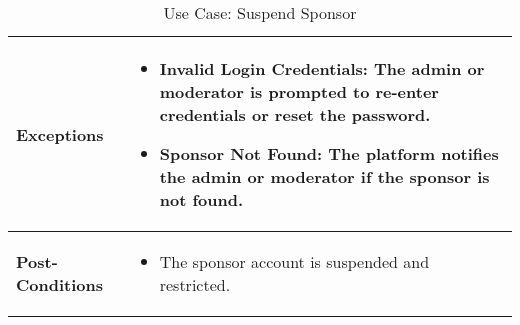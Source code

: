 \begin{table}[!ht]
\begin{tabularx}{\textwidth}{|l|X|}
        \textbf{Exceptions} & 
        \begin{itemize}[label=--,itemsep=0pt]
            \item Invalid Login Credentials: The admin or moderator is prompted to re-enter credentials or reset the password.
            \item Sponsor Not Found: The platform notifies the admin or moderator if the sponsor is not found.
        \end{itemize} \\
        \hline
        \textbf{Post-Conditions} & 
        \begin{itemize}[label=--,itemsep=0pt]
            \item The sponsor account is suspended and restricted.
        \end{itemize} \\
        \hline
    \end{tabularx}
    \caption{Use Case: Suspend Sponsor}
    \label{tab:use-case-suspend-sponsor}
\end{table}


